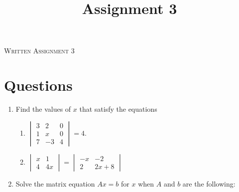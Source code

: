 \documentclass{article}
\title{Assignment 3}
\date{}
\begin{document}
\begin{center}
\textsc{\LARGE Written Assignment 3}\\[0.5cm]
\end{center}


\section*{Questions}

\begin{enumerate}
\item

Find the values of $x$ that satisfy the equations

\begin{enumerate}
\item \(
 \begin{vmatrix}
  3 &  2 &  0 \\
  1 &  x &  0 \\
  7 & -3 &  4
 \end{vmatrix} = 4.
\)
\item \(
 \begin{vmatrix}
  x & 1 \\
  4 & 4x
 \end{vmatrix} = \begin{vmatrix}
  -x & -2 \\
  2 & 2x + 8
 \end{vmatrix}
\)
\end{enumerate}

\item

Solve the matrix equation $Ax = b$ for $x$ when $A$ and $b$ are the 
following:


\end{enumerate}
\end{document}
